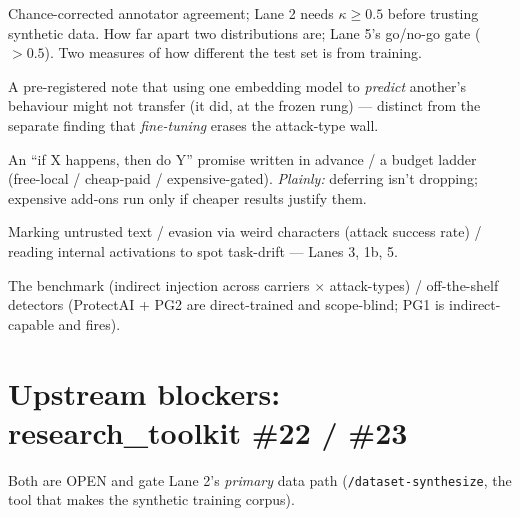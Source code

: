 \documentclass[11pt,parskip=half-]{scrartcl}
\newcommand{\code}[1]{\texttt{\small #1}}
\begin{document}
\begin{description}[leftmargin=0pt,style=unboxed,itemsep=3pt]
\item[]  Chance-corrected annotator agreement; Lane 2 needs
  $\kappa \ge 0.5$ before trusting synthetic data.  How far apart two
  distributions are; Lane 5's go/no-go gate ($>0.5$).  Two measures of how different
  the test set is from training.

\item[]  A pre-registered note that using one embedding model to
  \emph{predict} another's behaviour might not transfer (it did, at the frozen rung) --- distinct from
  the separate finding that \emph{fine-tuning} erases the attack-type wall.

\item[]  An ``if X happens, then do Y''
  promise written in advance / a budget ladder (free-local / cheap-paid / expensive-gated).
  \emph{Plainly:} deferring isn't dropping; expensive add-ons run only if cheaper results justify them.

\item[]  Marking untrusted text /
  evasion via weird characters (attack success rate) / reading internal activations to spot task-drift
  --- Lanes 3, 1b, 5.

\item[]  The benchmark (indirect injection across carriers
  $\times$ attack-types) / off-the-shelf detectors (ProtectAI + PG2 are direct-trained and scope-blind;
  PG1 is indirect-capable and fires).
\end{description}

\section{Upstream blockers: research\_toolkit \#22 / \#23}\label{sec:blockers}
Both are OPEN and gate Lane 2's \emph{primary} data path (\code{/dataset-synthesize}, the tool that makes
the synthetic training corpus).
\end{document}

